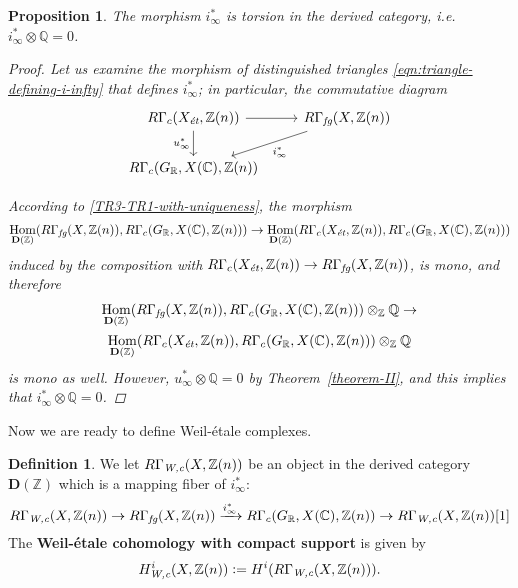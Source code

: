 \documentclass{article}
\DeclareMathOperator{\Hom}{Hom}
\newcommand{\CC}{\mathbb{C}}
\newcommand{\QQ}{\mathbb{Q}}
\newcommand{\RR}{\mathbb{R}}
\newcommand{\ZZ}{\mathbb{Z}}
\newcommand{\et}{\text{\it ét}}
\newcommand{\fg}{\text{\it fg}}
\newcommand{\Wc}{\text{\it W,c}}
\newcommand{\dfn}{\mathrel{\mathop:}=}
\newtheorem{proposition}[theorem]{Proposition}
\theoremstyle{definition}
\newtheorem{definition}[theorem]{Definition}
\numberwithin{equation}{section}
\begin{document}
\begin{proposition}
  \label{i-infty-is-torsion}
  The morphism $i_\infty^*$ is torsion in the derived category,
  i.e. $i_\infty^*\otimes \QQ = 0$.

  \begin{proof}
    Let us examine the morphism of distinguished triangles
    \eqref{eqn:triangle-defining-i-infty} that defines $i_\infty^*$; in
    particular, the commutative diagram
    \[ \begin{tikzcd}
      R\Gamma_c (X_\et, \ZZ (n)) \ar{r}\ar{d}[swap]{u_\infty^*} & R\Gamma_\fg (X, \ZZ (n))\ar{dl}{i_\infty^*} \\
      R\Gamma_c (G_\RR, X (\CC), \ZZ (n))
    \end{tikzcd} \]

    According to \ref{TR3-TR1-with-uniqueness}, the morphism
    \[ \Hom_{\mathbf{D} (\ZZ)} (R\Gamma_\fg (X,\ZZ (n)), R\Gamma_c (G_\RR, X (\CC), \ZZ (n))) \to
    \Hom_{\mathbf{D} (\ZZ)} (R\Gamma_c (X_\et, \ZZ (n)), R\Gamma_c (G_\RR, X (\CC), \ZZ (n))) \]
    induced by the composition with
    $R\Gamma_c (X_\et, \ZZ (n)) \to R\Gamma_\fg (X,\ZZ (n))$, is mono, and
    therefore
    \begin{multline*}
      \Hom_{\mathbf{D} (\ZZ)} (R\Gamma_\fg (X,\ZZ (n)), R\Gamma_c (G_\RR, X (\CC), \ZZ (n)))\otimes_\ZZ \QQ \to\\
      \Hom_{\mathbf{D} (\ZZ)} (R\Gamma_c (X_\et, \ZZ (n)), R\Gamma_c (G_\RR, X (\CC), \ZZ (n)))\otimes_\ZZ \QQ
    \end{multline*}
    is mono as well. However, $u_\infty^*\otimes \QQ = 0$ by
    Theorem~\ref{theorem-II}, and this implies that $i_\infty^*\otimes \QQ = 0$.
  \end{proof}
\end{proposition}

Now we are ready to define Weil-étale complexes.

\begin{definition}
  \label{dfn:RGammaWc}
  We let
  $R\Gamma_\Wc (X,\ZZ(n))$ be an object in the derived category
  $\mathbf{D} (\ZZ)$ which is a mapping fiber of $i_\infty^*$:
  \[ R\Gamma_\Wc (X,\ZZ(n)) \to
  R\Gamma_\fg (X, \ZZ (n)) \xrightarrow{i_\infty^*}
  R\Gamma_c (G_\RR, X (\CC), \ZZ (n)) \to
  R\Gamma_\Wc (X,\ZZ(n)) [1] \]
  The \textbf{Weil-étale cohomology with compact support} is given by
  $$H_\Wc^i (X, \ZZ (n)) \dfn H^i (R\Gamma_\Wc (X,\ZZ(n))).$$
\end{definition}
\end{document}
